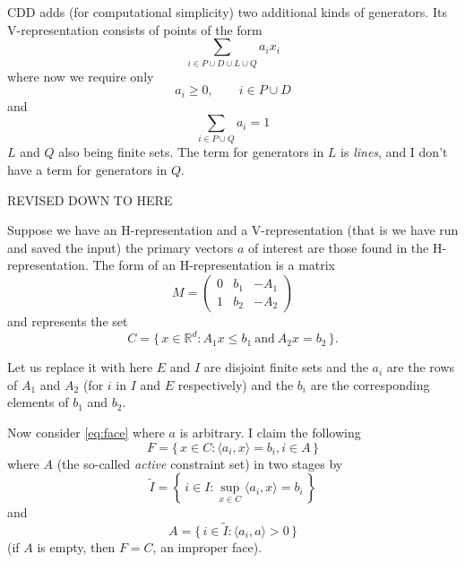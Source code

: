 \documentclass{article}
\newcommand{\set}[1]{\{\, #1 \,\}}
\newcommand{\bigset}[1]{\left\{\, #1 \,\right\}}
\newcommand{\inner}[1]{\langle #1 \rangle}
\newcommand{\real}{\mathbb{R}}
\begin{document}
CDD adds (for computational simplicity) two additional kinds of generators.
Its V-representation consists of points of the form
$$
   \sum_{i \in P \cup D \cup L \cup Q} a_i x_i
$$
where now we require only
$$
   a_i \ge 0, \qquad i \in P \cup D
$$
and
$$
   \sum_{i \in P \cup Q} a_i = 1
$$
$L$ and $Q$ also being finite sets.  The term for generators in $L$
is \emph{lines}, and I don't have a term for generators in $Q$.

\begin{center} \LARGE REVISED DOWN TO HERE \end{center}


Suppose we have an H-representation
and a V-representation (that is we have run \verb@scdd@ and saved the input)
the primary vectors $a$ of interest are those found in the H-representation.
The \verb@rcdd@ form of an H-representation is a matrix
$$
   M = \begin{pmatrix} 0 & b_1 & - A_1 \\ 1 & b_2 & - A_2 \end{pmatrix}
$$
and represents the set
$$
   C = \set{ x \in \real^d : A_1 x \le b_1 \ \text{and} \ A_2 x = b_2 }.
$$

Let us replace it with
here $E$ and $I$ are disjoint finite sets and the $a_i$ are the rows
of $A_1$ and $A_2$ (for $i$ in $I$ and $E$ respectively) and the $b_i$
are the corresponding elements of $b_1$ and $b_2$.

Now consider \eqref{eq:face} where $a$ is arbitrary.
I claim the following
$$
   F = \set{ x \in C : \inner{a_i, x} = b_i, i \in A }
$$
where $A$ (the so-called \emph{active} constraint set) in two
stages by
$$
   \widetilde{I} = \bigset{ i \in I : \sup_{x \in C} \inner{a_i, x} = b_i }
$$
and
$$
   A = \set{ i \in \widetilde{I} : \inner{a_i, a} > 0 }
$$
(if $A$ is empty, then $F = C$, an improper face).
\end{document}

